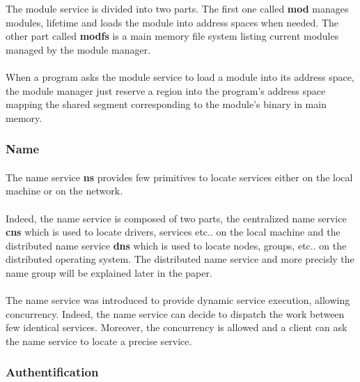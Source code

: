 \documentclass[10pt,a4wide]{article}
\begin{document}
\begin{multicols}{2}
The module service is divided into two parts. The first one called \textbf{mod}
manages modules, lifetime and loads the module into address spaces when needed.
The other part called \textbf{modfs} is a main memory file system listing
current modules managed by the module manager.

\paragraph{}

When a program asks the module service to load a module into its address
space, the module manager just reserve a region into the program's address
space mapping the shared segment corresponding to the module's binary in
main memory.

\subsubsection{Name}

\paragraph{}

The name service \textbf{ns} provides few primitives to locate services
either on the local machine or on the network.

\paragraph{}

Indeed, the name service is composed of two parts, the centralized name
service \textbf{cns} which is used to locate drivers, services etc.. on
the local machine and the distributed name service \textbf{dns} which is
used to locate nodes, groups, etc.. on the distributed operating system.
The distributed name service and more precisly the name group will be
explained later in the paper.

\paragraph{}

The name service was introduced to provide dynamic service execution, allowing
concurrency. Indeed, the name service can decide to dispatch the work between
few identical services. Moreover, the concurrency is allowed and a client
can ask the name service to locate a precise service.

\subsubsection{Authentification}


\end{multicols}
\end{document}
